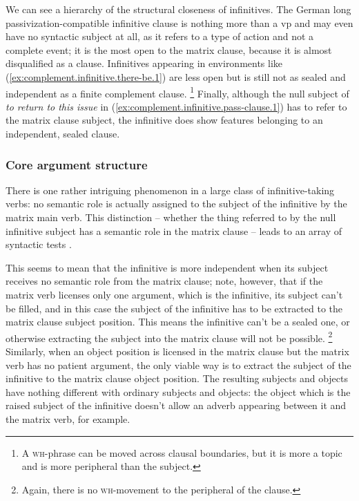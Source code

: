 \documentclass[UTF8, a4paper, oneside, scheme=plain, 12pt]{ctexbook}
\newcommand*{\citepage}[1]{p.~{#1}}
\newcommand{\form}[1]{\emph{#1}}
\newcommand{\category}[1]{\textsc{#1}}
\begin{document}
We can see a hierarchy of the structural closeness of infinitives.
The German long passivization-compatible infinitive clause is nothing more than a \acs{vp} 
and may even have no syntactic subject at all, 
as it refers to a type of action and not a complete event; 
it is the most open to the matrix clause, because it is almost disqualified as a clause.
Infinitives appearing in environments like (\ref{ex:complement.infinitive.there-be.1})
are less open but is still not as sealed and independent as a finite complement clause.%
\footnote{
    A \category{wh}-phrase can be moved across clausal boundaries, 
    but it is more a topic and is more peripheral than the subject.
}
Finally, although the null subject of \form{to return to this issue} 
in (\ref{ex:complement.infinitive.pass-clause.1})
has to refer to the matrix clause subject, 
the infinitive does show features belonging to an independent, sealed clause.

\subsubsection{Core argument structure}

There is one rather intriguing phenomenon in a large class of infinitive-taking verbs: 
no semantic role is actually assigned to the subject of the infinitive by the matrix main verb.
This distinction -- whether the thing referred to by the null infinitive subject 
has a semantic role in the matrix clause -- 
leads to an array of syntactic tests 
\citep[\citepage{1196}, {[8]}, except the matrix passivization and dummy subject tests]{cgel}.

This seems to mean that the infinitive is more independent 
when its subject receives no semantic role from the matrix clause; 
note, however, that if the matrix verb licenses only one argument, 
which is the infinitive, its subject can't be filled, 
and in this case the subject of the infinitive has to be extracted 
to the matrix clause subject position.
This means the infinitive can't be a sealed one, 
or otherwise extracting the subject into the matrix clause will not be possible.%
\footnote{
    Again, there is no \category{wh}-movement to the peripheral of the clause.
}
Similarly, when an object position is licensed in the matrix clause 
but the matrix verb has no patient argument, 
the only viable way is to extract the subject of the infinitive to the matrix clause object position.
The resulting subjects and objects have nothing different with ordinary subjects and objects: 
the object which is the raised subject of the infinitive
doesn't allow an adverb appearing between it and the matrix verb, for example.
\end{document}

